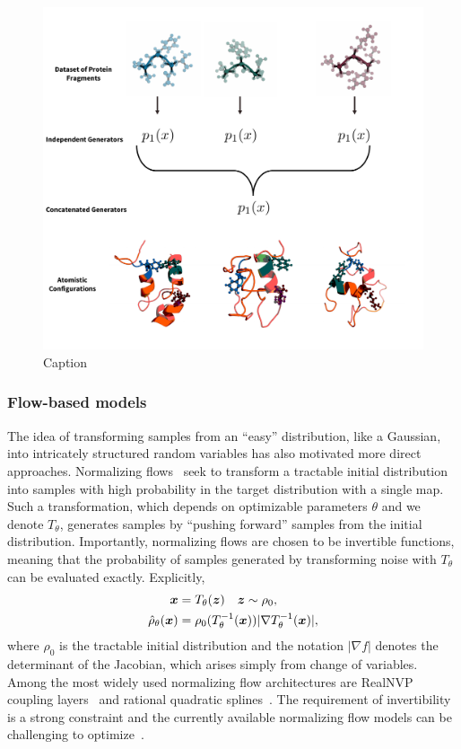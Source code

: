 \documentclass[11pt]{article}
\begin{document}
\begin{figure}
    \centering
    \includegraphics[width=0.6\linewidth]{modular_fig.pdf}
    \caption{Caption}
    \label{fig:enter-label}
\end{figure}

\subsubsection{Flow-based models}

The idea of transforming samples from an ``easy'' distribution, like a Gaussian, into intricately structured random variables has also motivated more direct approaches.
Normalizing flows~\cite{tabak_density_2010,rezende_variational_2015} seek to transform a tractable initial distribution into samples with high probability in the target distribution with a single map.
Such a transformation, which depends on optimizable parameters $\theta$ and we denote $T_{\theta}$, generates samples by ``pushing forward'' samples from the initial distribution. 
Importantly, normalizing flows are chosen to be invertible functions, meaning that the probability of samples generated by transforming noise with $T_{\theta}$ can be evaluated exactly.
Explicitly,
\begin{equation}
\begin{aligned}
    \boldsymbol{x} &= T_{\theta}(\boldsymbol{z}) \quad \boldsymbol{z} \sim \rho_0, \\
    \hat \rho_\theta(\boldsymbol{x}) &= \rho_0(T_{\theta}^{-1}(\boldsymbol{x})) |\nabla T_{\theta}^{-1}(\boldsymbol{x})|,
\end{aligned}
\end{equation}
where $\rho_0$ is the tractable initial distribution and the notation $|\nabla f|$ denotes the determinant of the Jacobian, which arises simply from change of variables. 
Among the most widely used normalizing flow architectures are RealNVP coupling layers~\cite{dinh_density_2017} and rational quadratic splines~\cite{durkan_neural_2019}.
The requirement of invertibility is a strong constraint and the currently available normalizing flow models can be challenging to optimize~\cite{grathwohl_ffjord_2018,gabrie_adaptive_2022}.
\end{document}
